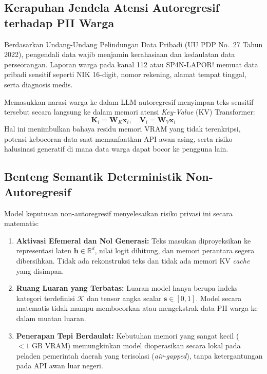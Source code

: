 \documentclass[journal,compsoc]{IEEEtran}
\begin{document}
\subsection{Kerapuhan Jendela Atensi Autoregresif terhadap PII Warga}
Berdasarkan Undang-Undang Pelindungan Data Pribadi (UU PDP No.~27 Tahun 2022), pengendali data wajib menjamin kerahasiaan dan kedaulatan data perseorangan. Laporan warga pada kanal 112 atau SP4N-LAPOR! memuat data pribadi sensitif seperti NIK 16-digit, nomor rekening, alamat tempat tinggal, serta diagnosis medis.

Memasukkan narasi warga ke dalam LLM autoregresif menyimpan teks sensitif tersebut secara langsung ke dalam memori atensi \textit{Key-Value} (KV) Transformer:
\begin{equation}
\mathbf{K}_i = \mathbf{W}_K \mathbf{x}_i, \quad \mathbf{V}_i = \mathbf{W}_V \mathbf{x}_i
\end{equation}
Hal ini menimbulkan bahaya residu memori VRAM yang tidak terenkripsi, potensi kebocoran data saat memanfaatkan API awan asing, serta risiko halusinasi generatif di mana data warga dapat bocor ke pengguna lain.

\subsection{Benteng Semantik Deterministik Non-Autoregresif}
Model keputusan non-autoregresif menyelesaikan risiko privasi ini secara matematis:
\begin{enumerate}
    \item \textbf{Aktivasi Efemeral dan Nol Generasi:} Teks masukan diproyeksikan ke representasi laten $\mathbf{h} \in \mathbb{R}^d$, nilai logit dihitung, dan memori perantara segera dibersihkan. Tidak ada rekonstruksi teks dan tidak ada memori KV \textit{cache} yang disimpan.
    \item \textbf{Ruang Luaran yang Terbatas:} Luaran model hanya berupa indeks kategori terdefinisi $\mathcal{K}$ dan tensor angka scalar $\mathbf{s} \in [0, 1]$. Model secara matematis tidak mampu membocorkan atau mengekstrak data PII warga ke dalam muatan luaran.
    \item \textbf{Penerapan Tepi Berdaulat:} Kebutuhan memori yang sangat kecil ($<1 \text{ GB}$ VRAM) memungkinkan model dioperasikan secara lokal pada peladen pemerintah daerah yang terisolasi (\textit{air-gapped}), tanpa ketergantungan pada API awan luar negeri.
\end{enumerate}
\end{document}
